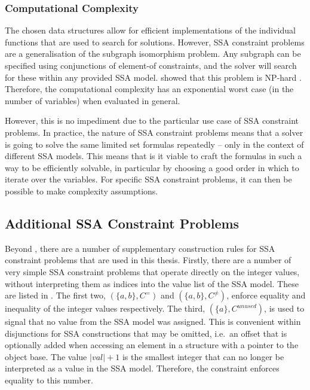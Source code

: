 \subsubsection{Computational Complexity}

    The chosen data structures allow for efficient implementations
    of the individual functions that are used to search for solutions.
    However, SSA constraint problems are a generalisation of the subgraph
    isomorphism problem.
    Any subgraph can be specified using conjunctions of element-of constraints,
    and the solver will search for these within any provided SSA model.
    \citet{Cook:1971:CTP:800157.805047} showed that this problem is NP-hard
    \citep{Leeuwen:1990:HTC:574797}.
    Therefore, the computational complexity has an exponential worst case
    (in the number of variables) when evaluated in general.

    However, this is no impediment due to the particular use case of
    SSA constraint problems.
    In practice, the nature of SSA constraint problems means that a solver is
    going to solve the same limited set formulas repeatedly -- only in the
    context of different SSA models.
    This means that is it viable to craft the formulas in such a way to be
    efficiently solvable, in particular by choosing a good order in which to
    iterate over the variables.
    For specific SSA constraint problems, it can then be possible to make
    complexity assumptions.

\subsection{Additional SSA Constraint Problems}

    Beyond , there are a
    number of supplementary construction rules for SSA constraint problems that
    are used in this thesis.
    Firstly, there are a number of very simple SSA constraint problems that
    operate directly on the integer values, without interpreting them as indices
    into the value list of the SSA model.
    These are listed in .
    The first two, $(\{a,b\}, C^=)$ and $(\{a,b\}, C^{\neq})$, enforce
    equality and inequality of the integer values respectively.
    The third, $(\{a\}, C^{unused})$, is used to signal that no value from the
    SSA model was assigned.
    This is convenient within disjunctions for SSA constructions that may be
    omitted, i.e.\ an offset that is optionally added when accessing an element
    in a structure with a pointer to the object base.
    The value $|val|+1$ is the smallest integer that can no longer be
    interpreted as a value in the SSA model.
    Therefore, the constraint enforces equality to this number.


